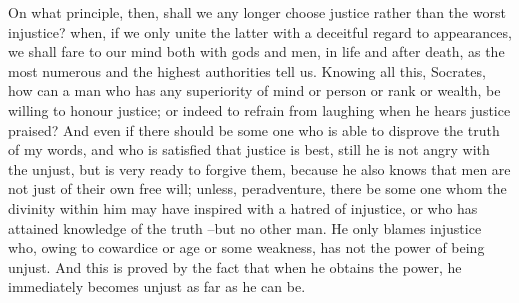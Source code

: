On what principle, then, shall we any longer choose justice rather than the worst injustice? when, if we only unite the latter with a deceitful regard to appearances, we shall fare to our mind both with gods and men, in life and after death, as the most numerous and the highest authorities tell us. Knowing all this, Socrates, how can a man who has any superiority of mind or person or rank or wealth, be willing to honour justice; or indeed to refrain from laughing when he hears justice praised? And even if there should be some one who is able to disprove the truth of my words, and who is satisfied that justice is best, still he is not angry with the unjust, but is very ready to forgive them, because he also knows that men are not just of their own free will; unless, peradventure, there be some one whom the divinity within him may have inspired with a hatred of injustice, or who has attained knowledge of the truth --but no other man. He only blames injustice who, owing to cowardice or age or some weakness, has not the power of being unjust. And this is proved by the fact that when he obtains the power, he immediately becomes unjust as far as he can be.

